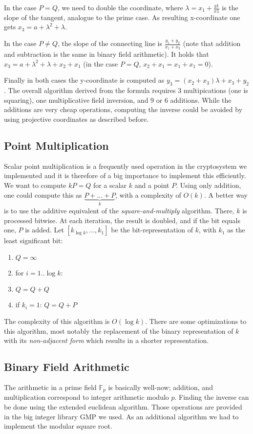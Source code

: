 \documentclass[11pt,english]{article}
\begin{document}
In the case $P=Q$, we need to double the coordinate, where $\lambda=x_1+\frac{y1}{x1}$ is the slope of the tangent, analogue to the prime case. As resulting x-coordinate one gets $x_3=a+\lambda^2+\lambda$.

In the case $P\ne Q$, the slope of the connecting line is $\frac{y_1+y_2}{x_1+x_2}$ (note that addition and subtraction is the same in binary field arithmetic). It holds that $x_3=a+\lambda^2+\lambda+x_2+x_1$ (in the case $P=Q$, $x_2+x_1=x_1+x_1=0$).

Finally in both cases the y-coordinate is computed as $y_3=(x_2+x_3)\lambda+x_3+y_2$. The overall algorithm derived from the formula requires 3 multipications (one is squaring), one multiplicative field inversion, and 9 or 6 additions. While the additions are very cheap operations, computing the inverse could be avoided by using projective coordinates as described before.

\subsection{Point Multiplication}
Scalar point multiplication is a frequently used operation in the cryptosystem we implemented and it is therefore of a big importance to implement this efficiently. We want to compute $kP=Q$ for a scalar $k$ and a point $P$. Using only addition, one could compute this as $\underbrace{P+...+P}_{k}$, with a complexity of $O(k)$. A better way is to use the additive equivalent of the \emph{square-and-multiply} algorithm. There, $k$ is processed bitwise. At each iteration, the result is doubled, and if the bit equals one, $P$ is added. Let $[k_{\log{k}},...,k_1]$ be the bit-representation of $k$, with $k_1$ as the least significant bit:

\begin{enumerate}
 \item $Q=\infty$
 \item for $i=1..\log{k}$:
 \item $Q=Q+Q$
 \item if $k_i=1$: $Q=Q+P$
\end{enumerate}

The complexity of this algorithm is $O(\log{k})$. There are some optimizations to this algorithm, most notably the replacement of the binary representation of $k$ with its \emph{non-adjacent form} which results in a shorter representation. 

\subsection{Binary Field Arithmetic}
The arithmetic in a prime field $\mathbb{F}_p$ is basically well-now; addition, and multiplication correspond to integer arithmetic modulo $p$. Finding the inverse can be done using the extended euclidean algorithm. Those operations are provided in the big integer library GMP we used. As an additional algorithm we had to implement the modular square root.
\end{document}

